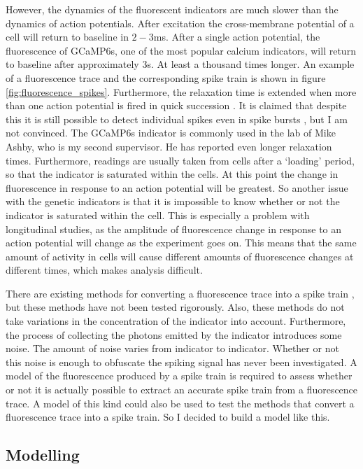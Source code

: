 \documentclass[a4paper,12pt]{article}
\theoremstyle{definition}
\begin{document}
	However, the dynamics of the fluorescent indicators are much slower than the dynamics of action potentials. After excitation the cross-membrane potential of a cell will return to baseline in $2-3$ms. After a single action potential, the fluorescence of GCaMP6s, one of the most popular calcium indicators, will return to baseline after approximately $3$s. At least a thousand times longer. An example of a fluorescence trace and the corresponding spike train is shown in figure \ref{fig:fluorescence_spikes}. Furthermore, the relaxation time is extended when more than one action potential is fired in quick succession \cite{chen}. It is claimed that despite this it is still possible to detect individual spikes even in spike bursts \cite{chen}, but I am not convinced. The GCaMP6s indicator is commonly used in the lab of Mike Ashby, who is my second supervisor. He has reported even longer relaxation times. Furthermore, readings are usually taken from cells after a `loading' period, so that the indicator is saturated within the cells. At this point the change in fluorescence in response to an action potential will be greatest. So another issue with the genetic indicators is that it is impossible to know whether or not the indicator is saturated within the cell. This is especially a problem with longitudinal studies, as the amplitude of fluorescence change in response to an action potential will change as the experiment goes on. This means that the same amount of activity in cells will cause different amounts of fluorescence changes at different times, which makes analysis difficult.
	
	There are existing methods for converting a fluorescence trace into a spike train \cite{paninski}, but these methods have not been tested rigorously. Also, these methods do not take variations in the concentration of the indicator into account. Furthermore, the process of collecting the photons emitted by the indicator introduces some noise. The amount of noise varies from indicator to indicator. Whether or not this noise is enough to obfuscate the spiking signal has never been investigated. A model of the fluorescence produced by a spike train is required to assess whether or not it is actually possible to extract an accurate spike train from a fluorescence trace. A model of this kind could also be used to test the methods that convert a fluorescence trace into a spike train. So I decided to build a model like this.
	
\subsection{Modelling}\label{modelling}
\end{document}
